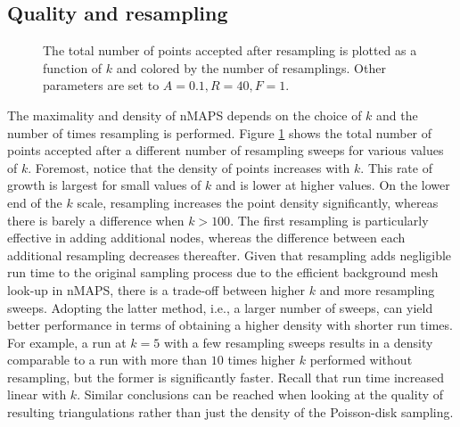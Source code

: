 \documentclass[preprint, 10pt]{elsarticle}
\theoremstyle{definition}
\theoremstyle{remark}
\begin{document}
\subsection{Quality and resampling}
\begin{figure}
	\centering
	
	\caption{The total number of points accepted after resampling is plotted as a function of $k$ and colored by the number of resamplings. Other parameters are set to $A=0.1, R=40, F=1$.}
	\label{fig:k_nodes_rep}
\end{figure}


The maximality and density of nMAPS depends on the choice of $k$ and the number of times resampling is performed. 
Figure \ref{fig:k_nodes_rep} shows the total number of points accepted after a different number of resampling sweeps for various values of $k$.
Foremost, notice that the density of points increases with $k$. 
This rate of growth is largest for small values of $k$ and is lower at higher values. 
On the lower end of the $k$ scale, resampling increases the point density significantly, whereas there is barely a difference when $k>100$. 
The first resampling is particularly effective in adding additional nodes, whereas the difference between each additional resampling decreases thereafter. 
Given that resampling adds negligible run time to the original sampling process due to the efficient background mesh look-up in nMAPS, there is a trade-off between higher $k$ and more resampling sweeps. 
Adopting the latter method, i.e., a larger number of sweeps, can yield better performance in terms of obtaining a higher density with shorter run times. 
For example, a run at $k=5$ with a few resampling sweeps results in a density comparable to a run with more than $10$ times higher $k$ performed without resampling, but the former is significantly faster. 
Recall that run time increased linear with $k$.
Similar conclusions can be reached when looking at the quality of resulting triangulations rather than just the density of the Poisson-disk sampling.
\end{document}
